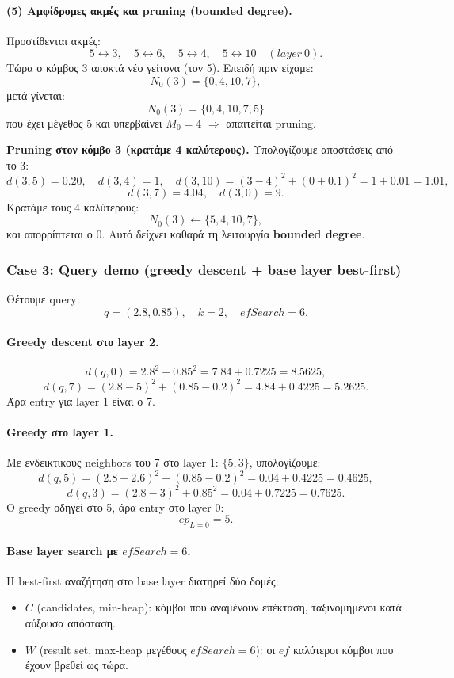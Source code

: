 \documentclass[12pt,a4paper]{article}
\begin{document}
\paragraph{(5) Αμφίδρομες ακμές και pruning (bounded degree).}
Προστίθενται ακμές:
\[
5\leftrightarrow 3,\quad 5\leftrightarrow 6,\quad 5\leftrightarrow 4,\quad 5\leftrightarrow 10 \quad (layer~0).
\]
Τώρα ο κόμβος 3 αποκτά νέο γείτονα (τον 5). Επειδή πριν είχαμε:
\[
N_0(3)=\{0,4,10,7\},
\]
μετά γίνεται:
\[
N_0(3)=\{0,4,10,7,5\}
\]
που έχει μέγεθος 5 και υπερβαίνει $M_0=4$ $\Rightarrow$ απαιτείται pruning.

\textbf{Pruning στον κόμβο 3 (κρατάμε 4 καλύτερους).}
Υπολογίζουμε αποστάσεις από το 3:
\[
d(3,5)=0.20,\quad
d(3,4)=1,\quad
d(3,10)=(3-4)^2+(0+0.1)^2=1+0.01=1.01,
\]
\[
d(3,7)=4.04,\quad d(3,0)=9.
\]
Κρατάμε τους 4 καλύτερους:
\[
N_0(3)\leftarrow \{5,4,10,7\},
\]
και απορρίπτεται ο 0.
Αυτό δείχνει καθαρά τη λειτουργία \textbf{bounded degree}.

\subsubsection{Case 3: Query demo (greedy descent + base layer best-first)}
\label{subsec:case_query_demo}

Θέτουμε query:
\[
q=(2.8,0.85),\quad k=2,\quad efSearch=6.
\]

\paragraph{Greedy descent στο layer 2.}
\[
d(q,0)=2.8^2+0.85^2=7.84+0.7225=8.5625,
\]
\[
d(q,7)=(2.8-5)^2+(0.85-0.2)^2=4.84+0.4225=5.2625.
\]
Άρα entry για layer 1 είναι ο 7.

\paragraph{Greedy στο layer 1.}
Με ενδεικτικούς neighbors του 7 στο layer 1: $\{5,3\}$, υπολογίζουμε:
\[
d(q,5)=(2.8-2.6)^2+(0.85-0.2)^2=0.04+0.4225=0.4625,
\]
\[
d(q,3)=(2.8-3)^2+0.85^2=0.04+0.7225=0.7625.
\]
Ο greedy οδηγεί στο 5, άρα entry στο layer 0:
\[
ep_{L=0}=5.
\]

\paragraph{Base layer search με $efSearch=6$.}
Η best-first αναζήτηση στο base layer διατηρεί δύο δομές:
\begin{itemize}
  \item $C$ (candidates, min-heap): κόμβοι που αναμένουν επέκταση, ταξινομημένοι κατά αύξουσα απόσταση.
  \item $W$ (result set, max-heap μεγέθους $efSearch=6$): οι $ef$ καλύτεροι κόμβοι που έχουν βρεθεί ως τώρα.
\end{itemize}
\end{document}
